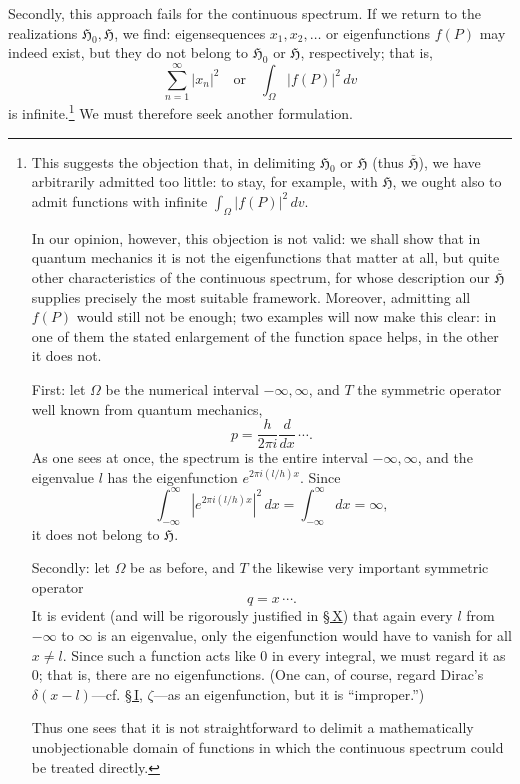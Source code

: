 \documentclass[fontsize=13pt,paper=b5,twoside,bookmarkpackage=false]{scrartcl}
\newcommand{\Sec}[1]{\hyperref[sec:#1]{\S\,#1}}
\begin{document}
Secondly, this approach fails for the continuous spectrum. If we return to the realizations $\mathfrak{H}_0,\mathfrak{H}$, we find: eigensequences $x_1,x_2,\ldots$ or eigenfunctions $f(P)$ may indeed exist, but they do not belong to $\mathfrak{H}_0$ or $\mathfrak{H}$, respectively; that is,
\[
 \sum_{n=1}^{\infty}|x_n|^2
 \quad\text{or}\quad
 \int_\Omega|f(P)|^2\,dv
\]
is infinite.\footnote[24]{\label{fn:24}This suggests the objection that, in delimiting $\mathfrak{H}_0$ or $\mathfrak{H}$ (thus $\overline{\mathfrak{H}}$), we have arbitrarily admitted too little: to stay, for example, with $\mathfrak{H}$, we ought also to admit functions with infinite $\int_\Omega|f(P)|^2\,dv$.

In our opinion, however, this objection is not valid: we shall show that in quantum mechanics it is not the eigenfunctions that matter at all, but quite other characteristics of the continuous spectrum, for whose description our $\overline{\mathfrak{H}}$ supplies precisely the most suitable framework. Moreover, admitting all $f(P)$ would still not be enough; two examples will now make this clear: in one of them the stated enlargement of the function space helps, in the other it does not.

First: let $\Omega$ be the numerical interval $-\infty,\infty$, and $T$ the symmetric operator well known from quantum mechanics,
\[
 p=\frac{h}{2\pi i}\frac{d}{dx}\,\cdots.
\]
As one sees at once, the spectrum is the entire interval $-\infty,\infty$, and the eigenvalue $l$ has the eigenfunction $e^{2\pi i(l/h)x}$. Since
\[
 \int_{-\infty}^{\infty}\left|e^{2\pi i(l/h)x}\right|^2\,dx
 =\int_{-\infty}^{\infty}dx=\infty,
\]
it does not belong to $\mathfrak{H}$.

Secondly: let $\Omega$ be as before, and $T$ the likewise very important symmetric operator
\[
 q=x\,\cdots.
\]
It is evident (and will be rigorously justified in \Sec{X}) that again every $l$ from $-\infty$ to $\infty$ is an eigenvalue, only the eigenfunction would have to vanish for all $x\ne l$. Since such a function acts like $0$ in every integral, we must regard it as $0$; that is, there are no eigenfunctions. (One can, of course, regard Dirac's $\delta(x-l)$---cf. \Sec{I}, $\zeta$---as an eigenfunction, but it is ``improper.'')

Thus one sees that it is not straightforward to delimit a mathematically unobjectionable domain of functions in which the continuous spectrum could be treated directly.}
We must therefore seek another formulation.
\end{document}
